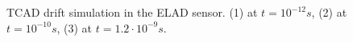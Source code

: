 \begin{figure}[H]
\begin{minipage}[h]{0.24\linewidth}
 \end{minipage}
 \begin{minipage}[h]{0.24\linewidth}
 \end{minipage}
\caption[short description here]
  {TCAD drift simulation in the ELAD sensor. (1) at $t = 10^{-12} s$, (2) at $t = 10^{-10} s$, (3) at $t = 1.2 \cdot 10^{-9} s$.}
\label{fig:drift}
\end{figure}

 